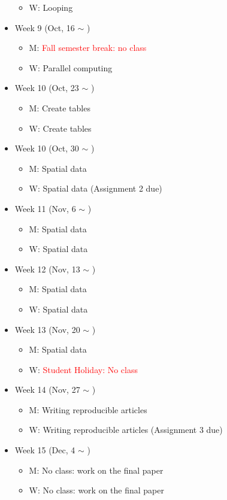 \documentclass[12pt]{article}
\begin{document}
\begin{itemize}
\begin{itemize}
    \item W: Looping
  \end{itemize}
  \item Week 9 (Oct, 16 $\sim$ )
  \begin{itemize}
    \item M: \textcolor{red}{Fall semester break: no class}
    \item W: Parallel computing
  \end{itemize}
  \item Week 10 (Oct, 23 $\sim$ )
  \begin{itemize}
    \item M: Create tables
    \item W: Create tables 
  \end{itemize}
  \item Week 10 (Oct, 30 $\sim$ )
  \begin{itemize}
    \item M: Spatial data
    \item W: Spatial data (Assignment 2 due)
  \end{itemize}
  \item Week 11 (Nov, 6 $\sim$ )
  \begin{itemize}
    \item M: Spatial data
    \item W: Spatial data
  \end{itemize}
  \item Week 12 (Nov, 13 $\sim$ )
  \begin{itemize}
    \item M: Spatial data
    \item W: Spatial data
  \end{itemize}
  \item Week 13 (Nov, 20 $\sim$ )
  \begin{itemize}
    \item M: Spatial data
    \item W: \textcolor{red}{Student Holiday: No class}
  \end{itemize}
  \item Week 14 (Nov, 27 $\sim$ )
  \begin{itemize}
    \item M: Writing reproducible articles
    \item W: Writing reproducible articles (Assignment 3 due)
  \end{itemize}
  \item Week 15 (Dec, 4 $\sim$ )
  \begin{itemize}
    \item M: No class: work on the final paper
    \item W: No class: work on the final paper
  \end{itemize}
\end{itemize}
\end{document}
